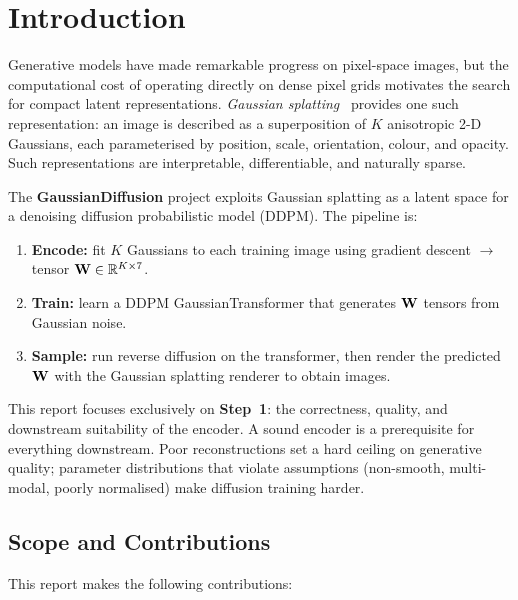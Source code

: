\section{Introduction}
\label{sec:introduction}

Generative models have made remarkable progress on pixel-space images, but the
computational cost of operating directly on dense pixel grids motivates the search
for compact latent representations.
\emph{Gaussian splatting}~\cite{kerbl20233d} provides one such representation:
an image is described as a superposition of $K$ anisotropic 2-D Gaussians,
each parameterised by position, scale, orientation, colour, and opacity.
Such representations are interpretable, differentiable, and naturally sparse.

The \textbf{GaussianDiffusion} project exploits Gaussian splatting as a latent
space for a denoising diffusion probabilistic model (DDPM).  The pipeline is:

\begin{enumerate}[leftmargin=2em]
  \item \textbf{Encode:} fit $K$ Gaussians to each training image using gradient
        descent $\rightarrow$ tensor $\mathbf{W} \in \mathbb{R}^{K \times 7}$.
  \item \textbf{Train:} learn a DDPM GaussianTransformer that generates $\mathbf{W}$
        tensors from Gaussian noise.
  \item \textbf{Sample:} run reverse diffusion on the transformer, then render
        the predicted $\mathbf{W}$ with the Gaussian splatting renderer to obtain images.
\end{enumerate}

\noindent
This report focuses exclusively on \textbf{Step~1}: the correctness, quality, and
downstream suitability of the encoder.
A sound encoder is a prerequisite for everything downstream.
Poor reconstructions set a hard ceiling on generative quality; parameter
distributions that violate assumptions (non-smooth, multi-modal, poorly normalised)
make diffusion training harder.

\subsection{Scope and Contributions}

\noindent This report makes the following contributions:

